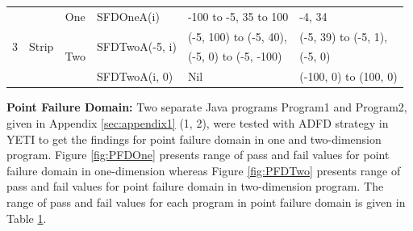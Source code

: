 \begin{table}[h]
{\begin{tabular}{|c|c|c|l|l|l|}
				



\multirow{5}{*}{3} 	&	\multirow{5}{*}{Strip}					& 	\multirow{2}{*}{One}			&	\multirow{2}{*}{SFDOneA(i)}	&	\multirow{2}{*}{-100 to -5, 35 to 100}		& 	\multirow{2}{*}{-4, 34	}\\ 
				&									&							&							&									&				\\  \cline{3-6}
				&									&	\multirow{3}{*}{Two}			&	\multirow{2}{*}{SFDTwoA(-5, i)}	&	(-5, 100) to (-5, 40),					&  (-5, 39) to (-5, 1), 			\\ 
				&									&							&							&	 (-5, 0) to (-5, -100)					&	(-5, 0)				\\ \cline{4-6}
				&									& 							&	SFDTwoA(i, 0)				&	Nil								&  (-100, 0) to (100, 0)			\\  \hline
				
				
\end{tabular}
}
\label{table:failtable}
\end{table}

\bigskip

\textbf{Point Failure Domain:}  Two separate Java programs Program1 and Program2, given in Appendix \ref{sec:appendix1} (1, 2), were tested with ADFD strategy in YETI to get the findings for point failure domain in one and two-dimension program. Figure \ref{fig:PFDOne} presents range of pass and fail values for point failure domain in one-dimension whereas Figure \ref{fig:PFDTwo} presents range of pass and fail values for point failure domain in two-dimension program. The range of pass and fail values for each program in point failure domain is given in Table \ref{table:failtable}.

